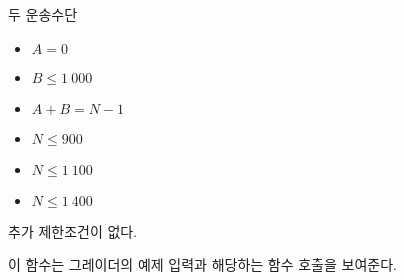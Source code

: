 \begin{problem}{두 운송수단}
	
	
	
	\begin{itemize}
		\item $A = 0$
	\end{itemize}
	
	\begin{itemize}
		\item $B \le 1\ 000$
	\end{itemize}
	
	\begin{itemize}
		\item $A+B = N-1$
	\end{itemize}

	\begin{itemize}
	\item $N \le 900$
	\end{itemize}
	
	\begin{itemize}
		\item $N \le 1\ 100$
	\end{itemize}
	
	\begin{itemize}
		\item $N \le 1\ 400$
	\end{itemize}

	
	
	
	추가 제한조건이 없다.
	
	\Examples
	
	이 함수는 그레이더의 예제 입력과 해당하는 함수 호출을 보여준다.
	

\end{problem}
